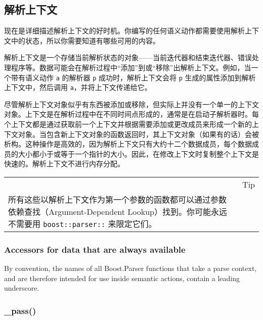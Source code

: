 \subsection{解析上下文}

现在是详细描述解析上下文的好时机。你编写的任何语义动作都需要使用解析上下文中的状态，所以你需要知道有哪些可用的内容。

解析上下文是一个存储当前解析状态的对象——当前迭代器和结束迭代器、错误处理程序等。数据可能会在解析过程中“添加”到或“移除”出解析上下文。例如，当一个带有语义动作 \texttt{a} 的解析器 \texttt{p} 成功时，解析上下文会将 \texttt{p} 生成的属性添加到解析上下文中，然后调用 \texttt{a}，并将上下文传递给它。

尽管解析上下文对象似乎有东西被添加或移除，但实际上并没有一个单一的上下文对象。上下文是在解析过程中在不同时间点形成的，通常是在启动子解析器时。每个上下文都是通过获取前一个上下文并根据需要添加或更改成员来形成一个新的上下文对象。当包含新上下文对象的函数返回时，其上下文对象（如果有的话）会被析构。这种操作是高效的，因为解析上下文只有大约十二个数据成员，每个数据成员的大小都小于或等于一个指针的大小。因此，在修改上下文时复制整个上下文是快速的。解析上下文不进行内存分配。

\begin{longtable}[]{@{}
  >{\raggedright\arraybackslash}p{}
  >{\raggedright\arraybackslash}p{}@{}}
\toprule\noalign{}
\endhead
\bottomrule\noalign{}
\endlastfoot
\begin{minipage}[t]{\linewidth}\raggedright
\end{minipage} & Tip \\
所有这些以解析上下文作为第一个参数的函数都可以通过参数依赖查找（Argument-Dependent Lookup）找到。你可能永远不需要用 \texttt{boost::parser::} 来限定它们。 & \\
\end{longtable}

\subsubsection{Accessors for data that are always available}

By convention, the names of all Boost.Parser functions that take a parse context, and are therefore intended for use inside semantic actions, contain a leading underscore.

\subsubsection{\_pass()}


